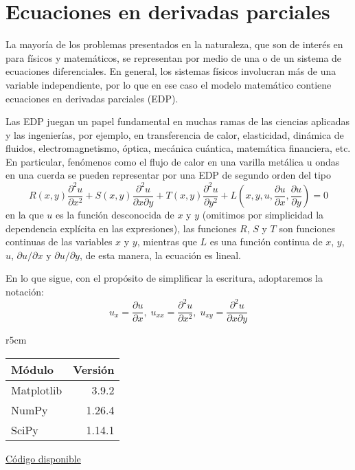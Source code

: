 

\chapter{Ecuaciones en derivadas parciales} \label{ch:parciales} 

La mayoría de los problemas presentados en la naturaleza, que son de interés en para físicos y matemáticos, se representan por medio de una o de un sistema de ecuaciones diferenciales. En general, los sistemas físicos involucran más de una variable independiente, por lo que en ese caso el modelo matemático contiene ecuaciones en derivadas parciales (EDP).

Las EDP juegan un papel fundamental en muchas ramas de las ciencias aplicadas y 
las ingenierías, por ejemplo, en transferencia de calor, elasticidad, dinámica de fluidos, electromagnetismo, óptica, mecánica cuántica, matemática financiera, etc. En particular, fenómenos como el flujo de calor en una varilla metálica u ondas en una cuerda se pueden representar por una EDP de segundo orden del tipo
\begin{equation} \label{eq:general}
 R(x,y) \frac{\partial^2 u}{\partial x^2} + S(x,y) \frac{\partial^2 u}{\partial x \partial y} + T(x,y) \frac{\partial^2 u}{\partial y^2} + L \left( x, y, u, \frac{\partial u}{\partial x}, \frac{\partial u}{\partial y} \right) = 0
\end{equation} 
en la que $u$ es la función desconocida de $x$ y $y$ (omitimos por simplicidad la dependencia explícita en las expresiones), las funciones $R$, $S$ y $T$ son funciones continuas de las variables $x$ y $y$, mientras que $L$ es una función continua de $x$, $y$, $u$, $\partial u / \partial x$ y $\partial u / \partial y$, de esta manera, la ecuación es lineal.

En lo que sigue, con el propósito de simplificar la escritura, adoptaremos la notación:
\[ u_x = \frac{\partial u}{\partial x}, \; u_{xx} = \frac{\partial^2 u}{\partial x^2}, \; u_{xy} = \frac{\partial^2 u}{\partial x \partial y} \]

\begin{wraptable}[12]{r}{5cm}
\begin{modulesinfo}
\begin{center}
{\small
    \begin{tabular}{l r}
        \toprule
        \textbf{Módulo} & \textbf{Versión} \\
        \midrule
        Matplotlib & 3.9.2 \\
        NumPy & 1.26.4 \\
        SciPy & 1.14.1 \\
        \bottomrule
    \end{tabular}
    \vspace{0.75em}
    
    \href{https://github.com/facundobatista/libro-pyciencia/tree/master/código/ecuaciones_parciales/}{Código disponible}
}
\end{center}
\end{modulesinfo}
\end{wraptable}

